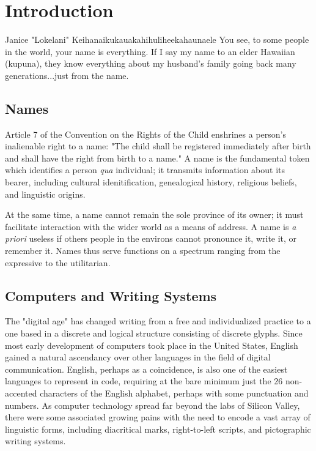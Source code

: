 \section{Introduction}

\begin{aquote}{Janice "Lokelani" Keihanaikukauakahihuliheekahaunaele}
You see, to some people in the world, your name is everything. If I say my name
to an elder Hawaiian (kupuna), they know everything about my husband's family
going back many generations...just from the name.
\end{aquote}

\subsection{Names}

Article 7 of the Convention on the Rights of the Child enshrines a person's
inalienable right to a name: "The child shall be registered immediately after
birth and shall have the right from birth to a name." \parencite{crc} A name is
the fundamental token which identifies a person \textit{qua} individual; it
transmits information about its bearer, including cultural idenitification,
genealogical history, religious beliefs, and linguistic origins.

At the same time, a name cannot remain the sole province of its owner; it must
facilitate interaction with the wider world as a means of address. A name is
\textit{a priori} useless if others people in the environs cannot pronounce it,
write it, or remember it. Names thus serve functions on a spectrum ranging from
the expressive to the utilitarian.

\subsection{Computers and Writing Systems}

The "digital age" has changed writing from a free and individualized practice to
a one based in a discrete and logical structure consisting of discrete glyphs.
Since most early development of computers took place in the United States,
English gained a natural ascendancy over other languages in the field of digital
communication. English, perhaps as a coincidence, is also one of the easiest
languages to represent in code, requiring at the bare minimum just the 26
non-accented characters of the English alphabet, perhaps with some punctuation
and numbers. As computer technology spread far beyond the labs of Silicon
Valley, there were some associated growing pains with the need to encode a vast
array of linguistic forms, including diacritical marks, right-to-left scripts,
and pictographic writing systems.
